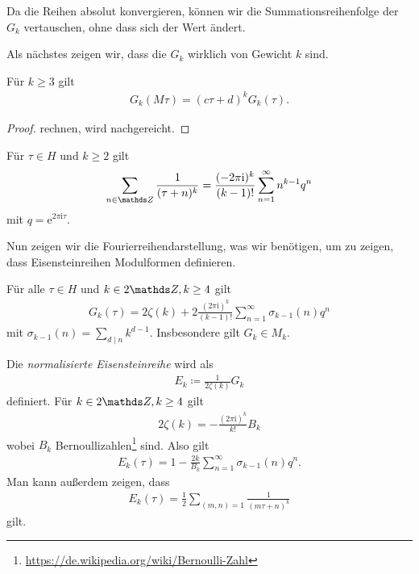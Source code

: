 \begin{bem}
Da die Reihen absolut konvergieren, können wir die Summationsreihenfolge der $G_k$ vertauschen,
ohne dass sich der Wert ändert.
\end{bem}

Als nächstes zeigen wir, dass die $G_k$ wirklich von Gewicht $k$ sind.

\begin{thm}
Für $k\geq 3$ gilt
\begin{align*}
G_k(M\tau)=(c\tau +d)^k G_k(\tau).
\end{align*}
\end{thm}
\begin{proof}
rechnen, wird nachgereicht.
\end{proof}

\begin{prop}
Für $\tau \in H$ und $k\geq 2$ gilt
\begin{align*}
\sum_{n \in \Z} \frac{1}{(\tau+n)^k}=\frac{(-2\pi \mathrm{i})^k}{(k-1)!}  \sum_{n=1}^\infty n^{k-1} q^n
\end{align*}
mit $q=\mathrm{e}^{2\pi \mathrm{i} \tau}$.
\end{prop}

Nun zeigen wir die Fourierreihendarstellung, was wir benötigen, um zu zeigen, dass Eisensteinreihen Modulformen definieren.
\begin{thm}
Für alle $\tau \in H$ und $k \in 2\Z, k\geq 4$ gilt
\begin{align*}
G_k(\tau)=2 \zeta(k)+2\frac{(2\pi \mathrm{i})^k}{(k-1)!} \sum_{n=1}^\infty \sigma_{k-1}(n)q^n
\end{align*}
mit $\sigma_{k-1}(n)=\sum_{d \mid n} k^{d-1}$.
Insbesondere gilt $G_k \in M_k$.
\end{thm}

\begin{defi}
Die \emph{normalisierte Eisensteinreihe} wird als
\begin{align*}
E_k\coloneqq  \frac{1}{2\zeta(k)} G_k
\end{align*}
definiert.
Für $k \in 2\Z, k\geq 4$ gilt
\begin{align*}
2 \zeta(k)=-\frac{(2\pi \mathrm{i})^k}{k!}B_k
\end{align*}
wobei $B_k$ Bernoullizahlen\footnote{\url{https://de.wikipedia.org/wiki/Bernoulli-Zahl}} sind.
Also gilt
\begin{align*}
E_k(\tau)=1-\frac{2k}{B_k} \sum_{n=1}^\infty \sigma_{k-1}(n)q^n.
\end{align*}
Man kann außerdem zeigen, dass
\begin{align*}
E_k(\tau)=\frac{1}{2} \sum_{(m,n)=1} \frac{1}{(m\tau +n)^k}
\end{align*}
gilt.
\end{defi}

